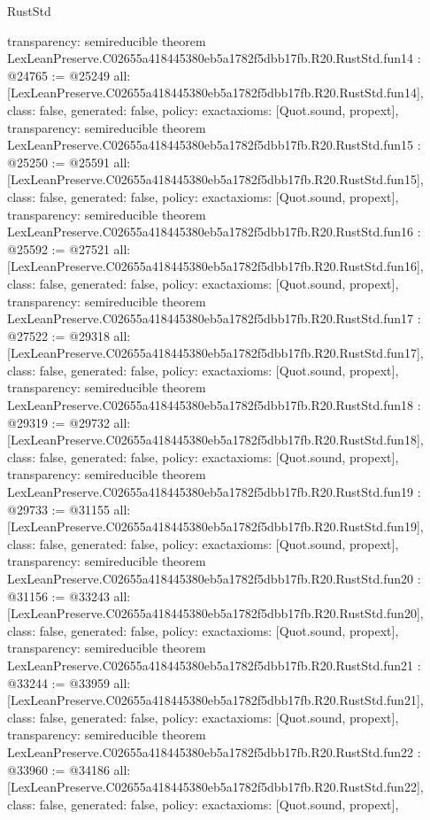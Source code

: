 \begin{lexlean}{RustStd}
\begin{coremodule}
{  transparency: semireducible
}
theorem LexLeanPreserve.C02655a418445380eb5a1782f5dbb17fb.R20.RustStd.fun14 : @24765 := @25249 {
  all: [LexLeanPreserve.C02655a418445380eb5a1782f5dbb17fb.R20.RustStd.fun14],
  class: false,
  generated: false,
  policy: exact{axioms: [Quot.sound, propext]},
  transparency: semireducible
}
theorem LexLeanPreserve.C02655a418445380eb5a1782f5dbb17fb.R20.RustStd.fun15 : @25250 := @25591 {
  all: [LexLeanPreserve.C02655a418445380eb5a1782f5dbb17fb.R20.RustStd.fun15],
  class: false,
  generated: false,
  policy: exact{axioms: [Quot.sound, propext]},
  transparency: semireducible
}
theorem LexLeanPreserve.C02655a418445380eb5a1782f5dbb17fb.R20.RustStd.fun16 : @25592 := @27521 {
  all: [LexLeanPreserve.C02655a418445380eb5a1782f5dbb17fb.R20.RustStd.fun16],
  class: false,
  generated: false,
  policy: exact{axioms: [Quot.sound, propext]},
  transparency: semireducible
}
theorem LexLeanPreserve.C02655a418445380eb5a1782f5dbb17fb.R20.RustStd.fun17 : @27522 := @29318 {
  all: [LexLeanPreserve.C02655a418445380eb5a1782f5dbb17fb.R20.RustStd.fun17],
  class: false,
  generated: false,
  policy: exact{axioms: [Quot.sound, propext]},
  transparency: semireducible
}
theorem LexLeanPreserve.C02655a418445380eb5a1782f5dbb17fb.R20.RustStd.fun18 : @29319 := @29732 {
  all: [LexLeanPreserve.C02655a418445380eb5a1782f5dbb17fb.R20.RustStd.fun18],
  class: false,
  generated: false,
  policy: exact{axioms: [Quot.sound, propext]},
  transparency: semireducible
}
theorem LexLeanPreserve.C02655a418445380eb5a1782f5dbb17fb.R20.RustStd.fun19 : @29733 := @31155 {
  all: [LexLeanPreserve.C02655a418445380eb5a1782f5dbb17fb.R20.RustStd.fun19],
  class: false,
  generated: false,
  policy: exact{axioms: [Quot.sound, propext]},
  transparency: semireducible
}
theorem LexLeanPreserve.C02655a418445380eb5a1782f5dbb17fb.R20.RustStd.fun20 : @31156 := @33243 {
  all: [LexLeanPreserve.C02655a418445380eb5a1782f5dbb17fb.R20.RustStd.fun20],
  class: false,
  generated: false,
  policy: exact{axioms: [Quot.sound, propext]},
  transparency: semireducible
}
theorem LexLeanPreserve.C02655a418445380eb5a1782f5dbb17fb.R20.RustStd.fun21 : @33244 := @33959 {
  all: [LexLeanPreserve.C02655a418445380eb5a1782f5dbb17fb.R20.RustStd.fun21],
  class: false,
  generated: false,
  policy: exact{axioms: [Quot.sound, propext]},
  transparency: semireducible
}
theorem LexLeanPreserve.C02655a418445380eb5a1782f5dbb17fb.R20.RustStd.fun22 : @33960 := @34186 {
  all: [LexLeanPreserve.C02655a418445380eb5a1782f5dbb17fb.R20.RustStd.fun22],
  class: false,
  generated: false,
  policy: exact{axioms: [Quot.sound, propext]},
}
\end{coremodule}
\end{lexlean}
